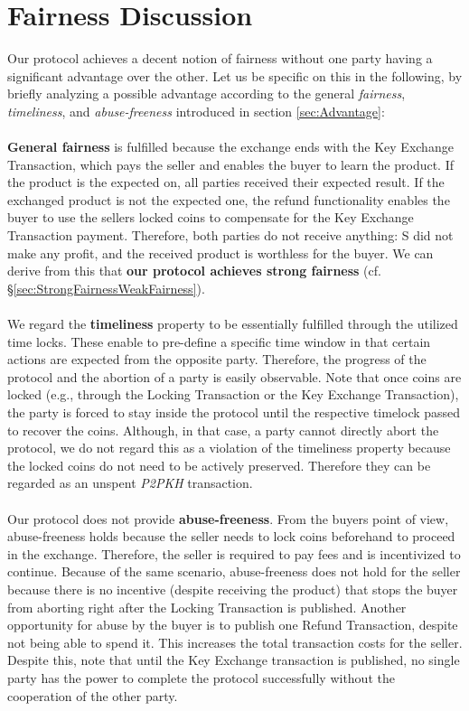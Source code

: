 \documentclass{cacthesis}
\newcounter{protocol}
\begin{document}
        
        \section{Fairness Discussion}
        \label{sec:FairnessDiscussion}
	    Our protocol achieves a decent notion of fairness without one party having a significant advantage over the other. Let us be specific on this in the following, by briefly analyzing a possible advantage according to the general \textit{fairness}, \textit{timeliness}, and \textit{abuse-freeness} introduced in section \ref{sec:Advantage}: \\\\
        \textbf{General fairness} is fulfilled because the exchange ends with the Key Exchange Transaction, which pays the seller and enables the buyer to learn the product. If the product is the expected on, all parties received their expected result. If the exchanged product is not the expected one, the refund functionality enables the buyer to use the sellers locked coins to compensate for the Key Exchange Transaction payment. Therefore, both parties do not receive anything: S did not make any profit, and the received product is worthless for the buyer. We can derive from this that \textbf{our protocol achieves strong fairness} (cf. §\ref{sec:StrongFairnessWeakFairness}). \\\\
        We regard the \textbf{timeliness} property to be essentially fulfilled through the utilized time locks. These enable to pre-define a specific time window in that certain actions are expected from the opposite party. Therefore, the progress of the protocol and the abortion of a party is easily observable. Note that once coins are locked (e.g., through the Locking Transaction or the Key Exchange Transaction), the party is forced to stay inside the protocol until the respective timelock passed to recover the coins. Although, in that case, a party cannot directly abort the protocol, we do not regard this as a violation of the timeliness property because the locked coins do not need to be actively preserved. Therefore they can be regarded as an unspent \textit{P2PKH} transaction. \\\\
        Our protocol does not provide \textbf{abuse-freeness}. From the buyers point of view, abuse-freeness holds because the seller needs to lock coins beforehand to proceed in the exchange. Therefore, the seller is required to pay fees and is incentivized to continue. Because of the same scenario, abuse-freeness does not hold for the seller because there is no incentive (despite receiving the product) that stops the buyer from aborting right after the Locking Transaction is published. Another opportunity for abuse by the buyer is to publish one Refund Transaction, despite not being able to spend it. This increases the total transaction costs for the seller. Despite this, note that until the Key Exchange transaction is published, no single party has the power to complete the protocol successfully without the cooperation of the other party. \\\\
\end{document}
